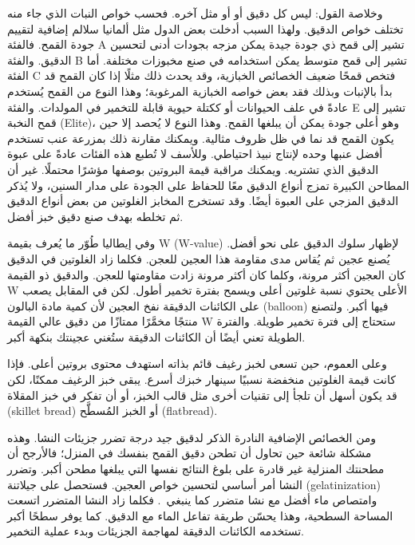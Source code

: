 وخلاصة القول: ليس كل دقيق  أو  أو  مثل آخره. فحسب خواص النبات الذي جاء منه تختلف خواص الدقيق. ولهذا السبب أدخلت بعض الدول مثل ألمانيا سلالم إضافية لتقييم جودة القمح. فالفئة A تشير إلى قمح ذي جودة جيدة يمكن مزجه بجودات أدنى لتحسين الدقيق. والفئة B تشير إلى قمح متوسط يمكن استخدامه في صنع مخبوزات مختلفة. أما الفئة C فتخص قمحًا ضعيف الخصائص الخبازية، وقد يحدث ذلك مثلًا إذا كان القمح قد بدأ بالإنبات وبذلك فقد بعض خواصه الخبازية المرغوبة؛ وهذا النوع من القمح يُستخدم عادةً في علف الحيوانات أو ككتلة حيوية قابلة للتخمير في المولدات. والفئة E تشير إلى قمح النخبة \textenglish{(Elite)}، وهو أعلى جودة يمكن أن يبلغها القمح. وهذا النوع لا يُحصد إلا حين يكون القمح قد نما في ظل ظروف مثالية. ويمكنك مقارنة ذلك بمزرعة عنب تستخدم أفضل عنبها وحده لإنتاج نبيذ احتياطي. وللأسف لا تُطبع هذه الفئات عادةً على عبوة الدقيق الذي تشتريه. ويمكنك مراقبة قيمة البروتين بوصفها مؤشرًا محتملًا. غير أن المطاحن الكبيرة تمزج أنواع الدقيق معًا للحفاظ على الجودة على مدار السنين، ولا يُذكر الدقيق المزجي على العبوة أيضًا. وقد تستخرج المخابز الغلوتين من بعض أنواع الدقيق ثم تخلطه بهدف صنع دقيق خبز أفضل.

وفي إيطاليا طُوّر ما يُعرف بقيمة W \textenglish{(W-value)} لإظهار سلوك الدقيق على نحو أفضل. يُصنع عجين ثم يُقاس مدى مقاومة هذا العجين للعجن. فكلما زاد الغلوتين في الدقيق كان العجين أكثر مرونة، وكلما كان أكثر مرونة زادت مقاومتها للعجن. والدقيق ذو القيمة W الأعلى يحتوي نسبة غلوتين أعلى ويسمح بفترة تخمير أطول. لكن في المقابل يصعب على الكائنات الدقيقة نفخ العجين لأن كمية مادة البالون \textenglish{(balloon)} فيها أكبر. ولتصنع منتجًا مخمَّرًا ممتازًا من دقيق عالي القيمة W ستحتاج إلى فترة تخمير طويلة. والفترة الطويلة تعني أيضًا أن الكائنات الدقيقة ستُغني عجينتك بنكهة أكبر.

\begin{table}[!htb]
\centering

\caption[مدة التخمير مقابل قيمة W]{نظرة عامة على مستويات مختلفة من قيمة W وما يقابلها من ترطيب ومدد تخمير.}\label{tab:w-value}
\end{table}

وعلى العموم، حين تسعى لخبز رغيف قائم بذاته استهدف محتوى بروتين أعلى. فإذا كانت قيمة الغلوتين منخفضة نسبيًا سينهار خبزك أسرع. يبقى خبز الرغيف ممكنًا، لكن قد يكون أسهل أن تلجأ إلى تقنيات أخرى مثل قالب الخبز، أو أن تفكر في خبز المقلاة \textenglish{(skillet bread)} أو الخبز المُسطَّح \textenglish{(flatbread)}.

ومن الخصائص الإضافية النادرة الذكر لدقيق جيد درجة تضرر جزيئات النشا. وهذه مشكلة شائعة حين تحاول أن تطحن دقيق القمح بنفسك في المنزل؛ فالأرجح أن مطحنتك المنزلية غير قادرة على بلوغ النتائج نفسها التي يبلغها مطحن أكبر. وتضرر النشا أمر أساسي لتحسين خواص العجين. فستحصل على جيلاتنة \textenglish{(gelatinization)} وامتصاص ماء أفضل مع نشا متضرر كما ينبغي~\cite{starch+damage+flour}. فكلما زاد النشا المتضرر اتسعت المساحة السطحية، وهذا يحسّن طريقة تفاعل الماء مع الدقيق. كما يوفر سطحًا أكبر تستخدمه الكائنات الدقيقة لمهاجمة الجزيئات وبدء عملية التخمير.

